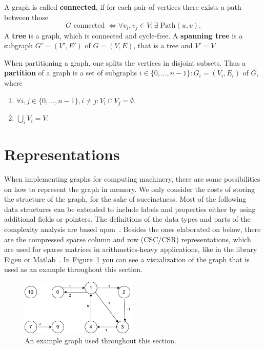         A graph is called \textbf{connected}, if for each pair of vertices there exists a path between those
        \[G \text{ connected } \Leftrightarrow \forall v_i, v_j \in V: \exists \text{ Path}(u, v).\]
        A \textbf{tree} is a graph, which is connected and cycle-free. 
        A \textbf{spanning tree} is a subgraph $G' = (V', E')$ of $G = (V, E)$, that is a tree and $V' = V$. 
        
        When partitioning a graph, one splits the vertices in disjoint subsets. 
        Thus a \textbf{partition} of a graph is a set of subgraphs $i\in \{0, \dots, n-1\}: G_i = (V_i, E_i)$ of $G$, where 
        \begin{enumerate}
            \item $\forall i,j \in \{0, \dots, n-1\}, i \neq j: V_i \cap V_j = \emptyset$.
            \item $\bigcup_i V_i = V$.
        \end{enumerate}
            
    \section{Representations}\label{\positionnumber}
        When implementing graphs for computing machinery, there are some possibilities on how to represent the graph in memory.
        We only consider the costs of storing the structure of the graph, for the sake of succinctness. 
        Most of the following data structures can be extended to include labels and properties either by using additional fields or pointers. 
        The definitions of the data types and parts of the complexity analysis are based upon~\autocite{Gross1998GraphTA, aho1974design, cormen2009introduction, Goodrich2014AlgorithmDA, steinhaus2010g}. 
        Besides the ones elaborated on below, there are the compressed sparse column and row (CSC/CSR) representations, which are used for sparse matrices in arithmetics-heavy applications, like in the library Eigen or Matlab~\autocite{steinhaus2010g, Eisenstat1982YaleSM}. In Figure~\ref{data_struct-ex} you can see a visualization of the graph that is used as an example throughout this section.
        
        \begin{figure}[htp]
            \begin{center}
                \includegraphics[keepaspectratio,width=0.5\textwidth]{img/03-graphs/data_struct_gr.png}
            \end{center}
            \caption{An example graph used throughout this section.} 
            \label{data_struct-ex}
        \end{figure}
        
